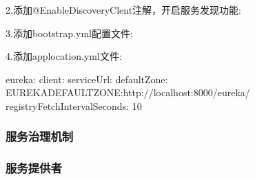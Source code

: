 \documentclass[letterpaper,10pt,english]{sphinxmanual}
\begin{document}
2.添加@EnableDiscoveryClent注解，开启服务发现功能:

\begin{sphinxVerbatim}[commandchars=\\\{\}]
   

           \PYG{p}{[}\PYG{p}{]}  

                 

\end{sphinxVerbatim}

3.添加bootstrap.yml配置文件:

\begin{sphinxVerbatim}[commandchars=\\\{\}]
   
     
\end{sphinxVerbatim}

4.添加applocation.yml文件:

\begin{sphinxVerbatim}[commandchars=\\\{\}]
eureka:
  client:
    serviceUrl:
      defaultZone: \PYGZdl{}\PYGZob{}EUREKA\PYGZus{}DEFAULT\PYGZus{}ZONE:http://localhost:8000/eureka/\PYGZcb{}
    registryFetchIntervalSeconds: 10
\end{sphinxVerbatim}


\subsubsection{服务治理机制}
\label{\detokenize{01.spring-cloud/02.eureka/eureka_03:id1}}\label{\detokenize{01.spring-cloud/02.eureka/eureka_03::doc}}
\noindent{}


\subsubsection{服务提供者}
\label{\detokenize{01.spring-cloud/02.eureka/eureka_03:id2}}
\end{document}
